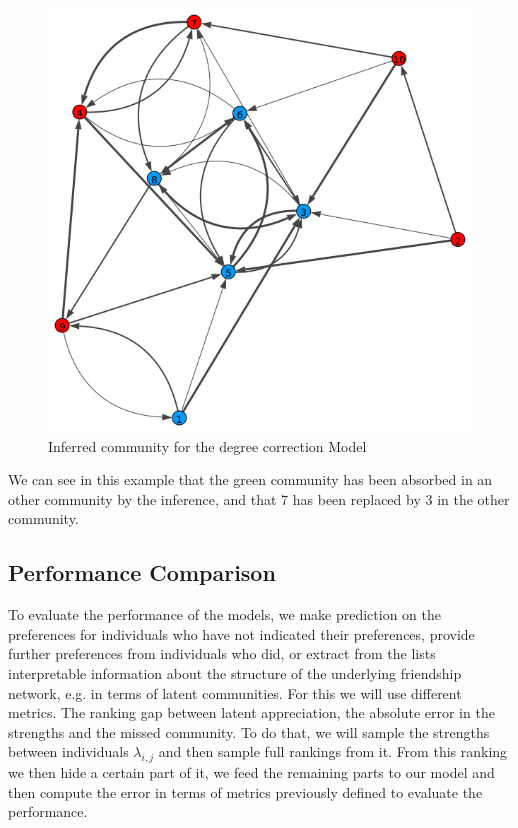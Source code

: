 \documentclass[12pt]{ociamthesis}  %
\begin{document}
	\begin{figure}
		\centering
		\includegraphics[width=\textwidth,height=\textheight,keepaspectratio]{OptimizationPlotDegreeCorrection}
		\caption{Inferred community for the degree correction Model}
		\label{label-image6}
	\end{figure}
	
	
	We can see in this example that the green community has been absorbed in an other community by the inference, and that 7 has been replaced by 3 in the other community.
	
	\subsection{Performance Comparison}
	
	To evaluate the performance of the models, we make prediction on the preferences for individuals who have not indicated their preferences, provide further preferences from individuals who did, or extract from the lists interpretable information about the structure of the underlying friendship network, e.g. in terms of latent communities. For this we will use different metrics. The ranking gap between latent appreciation, the absolute error in the strengths and the missed community. To do that, we will sample the strengths between individuals $\lambda_{i,j}$ and then sample full rankings from it. From this ranking we then hide a certain part of it, we feed the remaining parts to our model and then compute the error in terms of metrics previously defined to evaluate the performance.
	
\end{document}
